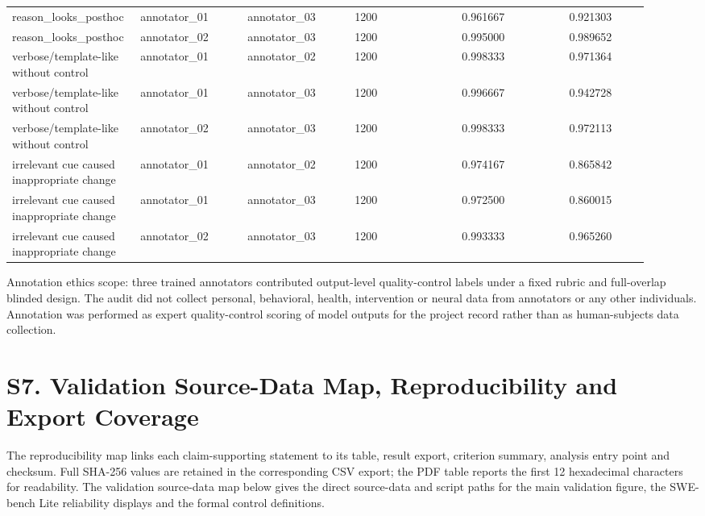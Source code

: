 \documentclass[11pt]{article}
\begin{document}
\begin{landscape}
\begin{longtable}{@{}L{0.160\linewidth}L{0.160\linewidth}L{0.160\linewidth}L{0.160\linewidth}L{0.160\linewidth}L{0.120\linewidth}@{}}
reason\_looks\_posthoc & annotator\_01 & annotator\_03 & 1200 & 0.961667 & 0.921303 \\
reason\_looks\_posthoc & annotator\_02 & annotator\_03 & 1200 & 0.995000 & 0.989652 \\
verbose/template-like without control & annotator\_01 & annotator\_02 & 1200 & 0.998333 & 0.971364 \\
verbose/template-like without control & annotator\_01 & annotator\_03 & 1200 & 0.996667 & 0.942728 \\
verbose/template-like without control & annotator\_02 & annotator\_03 & 1200 & 0.998333 & 0.972113 \\
irrelevant cue caused inappropriate change & annotator\_01 & annotator\_02 & 1200 & 0.974167 & 0.865842 \\
irrelevant cue caused inappropriate change & annotator\_01 & annotator\_03 & 1200 & 0.972500 & 0.860015 \\
irrelevant cue caused inappropriate change & annotator\_02 & annotator\_03 & 1200 & 0.993333 & 0.965260 \\
\end{longtable}
\normalsize
\end{landscape}

Annotation ethics scope: three trained annotators contributed output-level quality-control labels under a fixed rubric and full-overlap blinded design. The audit did not collect personal, behavioral, health, intervention or neural data from annotators or any other individuals. Annotation was performed as expert quality-control scoring of model outputs for the project record rather than as human-subjects data collection.

\clearpage\section*{S7. Validation Source-Data Map, Reproducibility and Export Coverage}

The reproducibility map links each claim-supporting statement to its table, result export, criterion summary, analysis entry point and checksum. Full SHA-256 values are retained in the corresponding CSV export; the PDF table reports the first 12 hexadecimal characters for readability. The validation source-data map below gives the direct source-data and script paths for the main validation figure, the SWE-bench Lite reliability displays and the formal control definitions.
\end{document}
